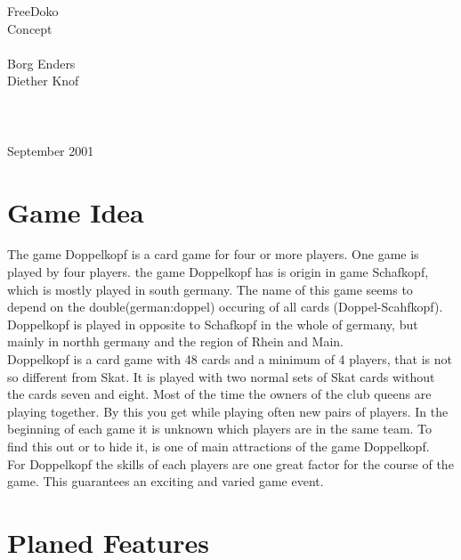 \documentclass[12pt,a4paper]{article}
\begin{document}
\thispagestyle{empty}
\begin{center}
 \linespread{2.0}
{\Huge
FreeDoko
\ \\
\vspace{2cm}
Concept
\ \\
\vspace{2cm}
}
{\large
\ \\
\vspace{2cm}
Borg Enders\\
Diether Knof
\ \\
\vspace{2cm}
\ \\
}
\ \\
\vspace{2cm}
\ \\
September 2001
\end{center}
\newpage
\tableofcontents \newpage
\section{Game Idea}
The game Doppelkopf is a card game for four or more players.
One game is played by four players. the game Doppelkopf has is origin in game Schafkopf,
which is mostly played in south germany.
The name of this game seems to depend on the double(german:doppel) occuring of all cards (Doppel-Scahfkopf).
Doppelkopf is played in opposite to Schafkopf in the whole of germany, but mainly in northh germany and
the region of Rhein and Main.\\
Doppelkopf is a card game with 48 cards and a minimum of 4 players, that is not so different from Skat.
It is played with two normal sets of Skat cards without the cards seven and eight. Most of the time the owners of the club queens
are playing together. By this you get while playing often new pairs of players.
In the beginning of each game it is unknown which players are in the same team.
To find this out or to hide it, is one of main attractions of the game Doppelkopf.\\
For Doppelkopf the skills of each players are one great factor for the course of the game.
This guarantees an exciting and varied game event.
\newpage
\section{Planed Features}
\end{document}
